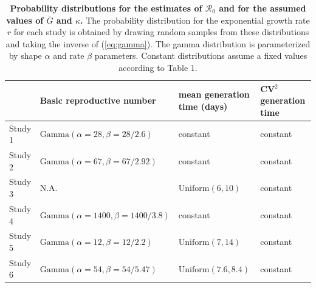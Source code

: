 \documentclass[12pt]{article}
\newcommand{\eref}[1]{(\ref{eq:#1})}
\begin{document}
\begin{table}[t]
\begin{center}
\footnotesize
\begin{tabular}{l|l|l|l}
 & Basic reproductive number & mean generation time (days) & CV$^2$ generation time \\
\hline
Study 1 & $\mathrm{Gamma}(\alpha=28, \beta=28/2.6)$ & constant & constant \\
\hline
Study 2 & $\mathrm{Gamma}(\alpha=67, \beta=67/2.92)$ & constant & constant \\
\hline
Study 3 & N.A. & $\mathrm{Uniform}(6, 10)$ & constant\\
\hline
Study 4 & $\mathrm{Gamma}(\alpha=1400, \beta=1400/3.8)$ & constant & constant \\
\hline
Study 5 & $\mathrm{Gamma}(\alpha=12, \beta=12/2.2)$ & $\mathrm{Uniform}(7, 14)$ & constant\\
\hline
Study 6 & $\mathrm{Gamma}(\alpha=54, \beta=54/5.47)$ & $\mathrm{Uniform}(7.6, 8.4)$ & constant
\end{tabular}
\end{center}
\caption{
\textbf{Probability distributions for the estimates of $\mathcal R_0$ and for the assumed values of $\bar G$ and $\kappa$.}
The probability distribution for the exponential growth rate $r$ for each study is obtained by drawing random samples from these distributions and taking the inverse of \eref{gamma}.
The gamma distribution is parameterized by shape $\alpha$ and rate $\beta$ parameters.
Constant distributions assume a fixed values according to Table 1.
}
\end{table}
\end{document}
